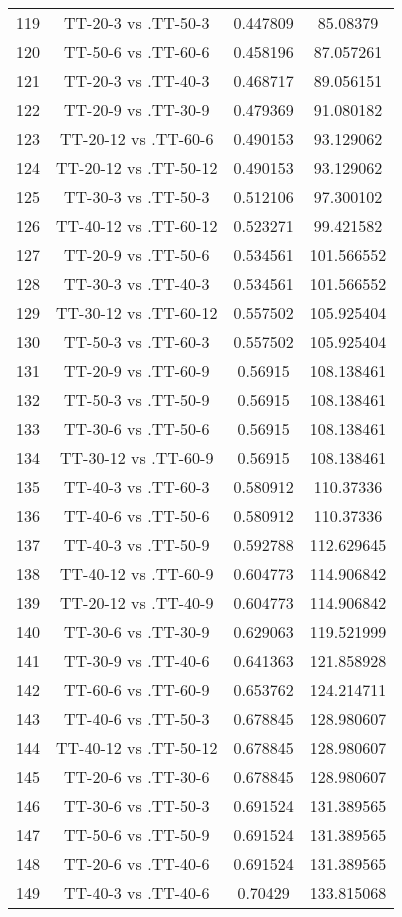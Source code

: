 \documentclass[a4paper,10pt]{article}
\begin{document}
\begin{landscape}
\begin{table}[!htp]
\begin{tabular}{cccc}
119&TT-20-3 vs .TT-50-3&0.447809&85.08379\\
120&TT-50-6 vs .TT-60-6&0.458196&87.057261\\
121&TT-20-3 vs .TT-40-3&0.468717&89.056151\\
122&TT-20-9 vs .TT-30-9&0.479369&91.080182\\
123&TT-20-12 vs .TT-60-6&0.490153&93.129062\\
124&TT-20-12 vs .TT-50-12&0.490153&93.129062\\
125&TT-30-3 vs .TT-50-3&0.512106&97.300102\\
126&TT-40-12 vs .TT-60-12&0.523271&99.421582\\
127&TT-20-9 vs .TT-50-6&0.534561&101.566552\\
128&TT-30-3 vs .TT-40-3&0.534561&101.566552\\
129&TT-30-12 vs .TT-60-12&0.557502&105.925404\\
130&TT-50-3 vs .TT-60-3&0.557502&105.925404\\
131&TT-20-9 vs .TT-60-9&0.56915&108.138461\\
132&TT-50-3 vs .TT-50-9&0.56915&108.138461\\
133&TT-30-6 vs .TT-50-6&0.56915&108.138461\\
134&TT-30-12 vs .TT-60-9&0.56915&108.138461\\
135&TT-40-3 vs .TT-60-3&0.580912&110.37336\\
136&TT-40-6 vs .TT-50-6&0.580912&110.37336\\
137&TT-40-3 vs .TT-50-9&0.592788&112.629645\\
138&TT-40-12 vs .TT-60-9&0.604773&114.906842\\
139&TT-20-12 vs .TT-40-9&0.604773&114.906842\\
140&TT-30-6 vs .TT-30-9&0.629063&119.521999\\
141&TT-30-9 vs .TT-40-6&0.641363&121.858928\\
142&TT-60-6 vs .TT-60-9&0.653762&124.214711\\
143&TT-40-6 vs .TT-50-3&0.678845&128.980607\\
144&TT-40-12 vs .TT-50-12&0.678845&128.980607\\
145&TT-20-6 vs .TT-30-6&0.678845&128.980607\\
146&TT-30-6 vs .TT-50-3&0.691524&131.389565\\
147&TT-50-6 vs .TT-50-9&0.691524&131.389565\\
148&TT-20-6 vs .TT-40-6&0.691524&131.389565\\
149&TT-40-3 vs .TT-40-6&0.70429&133.815068\\

\end{tabular}
\end{table}
\end{landscape}
\end{document}
